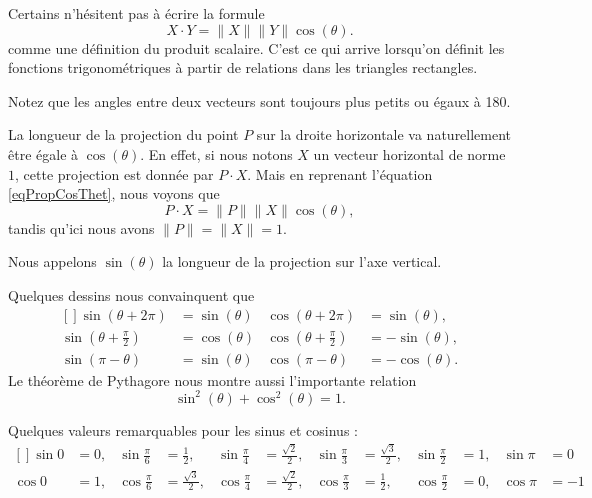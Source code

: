 \begin{normaltext}
	Certains n'hésitent pas à écrire la formule
	\begin{equation}		\label{eqPropCosThet}
		X\cdot Y=\| X \|\| Y \|\cos(\theta).
	\end{equation}
	comme une définition du produit scalaire. C'est ce qui arrive lorsqu'on définit les fonctions trigonométriques à partir de relations dans les triangles rectangles.
\end{normaltext}

Notez que les angles entre deux vecteurs sont toujours plus petits ou égaux à \unit{180}{\degree}.

La longueur de la projection du point \( P\) sur la droite horizontale va naturellement être égale à \( \cos(\theta)\). En effet, si nous notons \( X\) un vecteur horizontal de norme \( 1\), cette projection est donnée par \( P\cdot X\). Mais en reprenant l'équation \eqref{eqPropCosThet}, nous voyons que
\begin{equation}
	P\cdot X=\| P \|\| X \|\cos(\theta),
\end{equation}
tandis qu'ici nous avons \( \| P \|=\| X \|=1\).

Nous appelons \( \sin(\theta)\) la longueur de la projection sur l'axe vertical.

Quelques dessins nous convainquent que
\begin{equation}
	\begin{aligned}[]
		\sin(\theta+2\pi)            & =\sin(\theta) & \cos(\theta+2\pi)            & =\sin(\theta),  \\
		\sin(\theta+\frac{ \pi }{2}) & =\cos(\theta) & \cos(\theta+\frac{ \pi }{2}) & =-\sin(\theta), \\
		\sin(\pi-\theta)             & =\sin(\theta) & \cos(\pi-\theta)             & =-\cos(\theta).
	\end{aligned}
\end{equation}
Le théorème de Pythagore nous montre aussi l'importante relation
\begin{equation}
	\sin^2(\theta)+\cos^2(\theta)=1.
\end{equation}

Quelques valeurs remarquables pour les sinus et cosinus :
\begin{equation}
	\begin{aligned}[]
		\sin 0 & =0, & \sin\frac{ \pi }{ 6 } & =\frac{ 1 }{2},        & \sin\frac{ \pi }{ 4 } & =\frac{ \sqrt{2} }{2}, & \sin\frac{ \pi }{ 3 } & =\frac{ \sqrt{3} }{2}, & \sin\frac{ \pi }{2} & =1, & \sin\pi & =0  \\
		\cos 0 & =1, & \cos\frac{ \pi }{ 6 } & =\frac{ \sqrt{3} }{2}, & \cos\frac{ \pi }{ 4 } & =\frac{ \sqrt{2} }{2}, & \cos\frac{ \pi }{ 3 } & =\frac{ 1 }{2},        & \cos\frac{ \pi }{2} & =0, & \cos\pi & =-1
	\end{aligned}
\end{equation}

